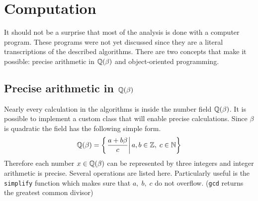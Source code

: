 \documentclass[text.tex]{subfiles}
\begin{document}
\section*{Computation}
It should not be a surprise that most of the analysis is done with a computer program. These programs were not yet discussed since they are a literal transcriptions of the described algorithms. There are two concepts that make it possible: precise arithmetic in $\mathbb{Q}(\beta)$ and object-oriented programming. 
\subsection{Precise arithmetic in $\mathbb{Q}(\beta)$}
Nearly every calculation in the algorithms is inside the number field $\mathbb{Q}(\beta)$. It is possible to implement a custom class that will enable precise calculations. Since $\beta$ is quadratic the field has the following simple form.
$$\mathbb{Q}(\beta) = \left\{\left. \frac{a + b\beta}{c} \right|a,b\in \mathbb{Z},\; c\in\mathbb{N} \right\}$$
Therefore each number $x\in\mathbb{Q}(\beta)$ can be represented by three integers and integer arithmetic is precise. Several operations are listed here. Particularly useful is the \texttt{simplify} function which makes sure that $a,\;b,\;c$ do not overflow. (\texttt{gcd} returns the greatest common divisor)
\end{document}
